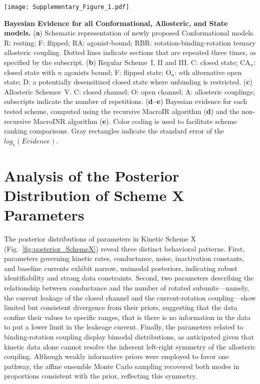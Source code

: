 \documentclass[pdflatex,sn-nature]{sn-jnl}%
\theoremstyle{thmstyleone}%
\theoremstyle{thmstyletwo}%
\theoremstyle{thmstylethree}%
\begin{document}
\begin{extfigure}[t]
	\centering
	\texttt{[image: Supplementary\_Figure\_1.pdf]}
	\caption{\textbf{Bayesian Evidence for all Conformational, Allosteric, and State models.}  
		(\textbf{a}) Schematic representation of newly proposed Conformational models. R: resting; F: flipped; RA: agonist-bound; RBR: rotation-binding-rotation ternary allosteric coupling. Dotted lines indicate sections that are repeated three times, as specified by the subscript.  
		(\textbf{b}) Regular Scheme~I, II and III. C: closed state; CA$_n$: closed state with $n$ agonists bound; F: flipped state; O$_n$: $n$th alternative open state; D: a potentially desensitized closed state where unbinding is restricted.  
		(\textbf{c}) Allosteric Schemes~V. C: closed channel; O: open channel; A: allosteric couplings; subscripts indicate the number of repetitions.  
		(\textbf{d--e}) Bayesian evidence for each tested scheme, computed using the recursive MacroIR algorithm (\textbf{d}) and the non-recursive MacroINR algorithm (\textbf{e}). Color coding is used to facilitate scheme ranking comparisons. Gray rectangles indicate the standard error of the $log_e(Evidence)$.  
	}
	\label{extfig:1}
\end{extfigure}



\section{Analysis of the Posterior Distribution of Scheme X Parameters}
The posterior distributions of parameters in Kinetic Scheme X (Fig.~\ref{fig:posterior_SchemeX}) reveal three distinct behavioral patterns. First, parameters governing kinetic rates, conductance, noise, inactivation constants, and baseline currents exhibit narrow, unimodal posteriors, indicating robust identifiability and strong data constraints. Second, two parameters describing the relationship between conductance and the number of rotated subunits---namely, the current leakage of the closed channel and the current-rotation coupling---show limited but consistent divergence from their priors, suggesting that the data confine their values to specific ranges, that is there is no information in the data to put a lower limit in the leakeage current. 
Finally, the parameters related to binding-rotation coupling display bimodal distributions, as anticipated given that kinetic data alone cannot resolve the inherent left-right symmetry of the allosteric coupling. Although weakly informative priors were employed to favor one pathway, the affine ensemble Monte Carlo sampling recovered both modes in proportions consistent with the prior, reflecting this symmetry.
\end{document}
